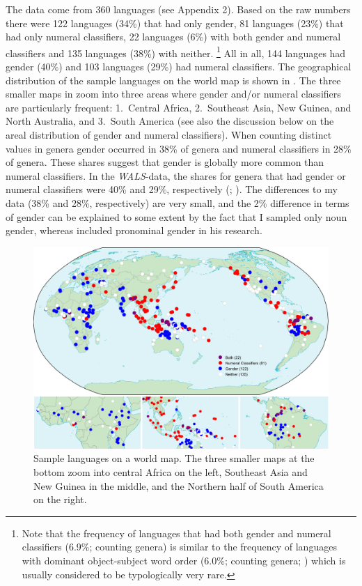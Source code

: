 \documentclass[output=collectionpaper]{langsci/langscibook}
\begin{document}
The data come from 360 languages (see Appendix 2). Based on the raw numbers there were 122 languages (34\%) that had only gender, 81 languages (23\%) that had only numeral classifiers, 22 languages (6\%) with both gender and numeral classifiers and 135 languages (38\%) with neither.%
\footnote{Note that the frequency of languages that had both gender and numeral classifiers (6.9\%; counting genera) is similar to the frequency of languages with dominant object-subject word order (6.0\%; counting genera; \citealt{Dryer2013}) which is usually considered to be typologically very rare.} %
All in all, 144 languages had gender (40\%) and 103 languages (29\%) had numeral classifiers. The geographical distribution of the sample languages on the world map is shown in . The three smaller maps in  zoom into three areas where gender and/or numeral classifiers are particularly frequent: 1.~Central Africa, 2.~Southeast Asia, New Guinea, and North Australia, and 3.~South America (see also the discussion below on the areal distribution of gender and numeral classifiers). When counting distinct values in genera gender occurred in 38\% of genera and numeral classifiers in 28\% of genera. These shares suggest that gender is globally more common than numeral classifiers. In the \textit{WALS}-data, the shares for genera that had gender or numeral classifiers were 40\% and 29\%, respectively (\citealt{Corbett2013}; \citealt{Gil2013}). The differences to my data (38\% and 28\%, respectively) are very small, and the 2\% difference in terms of gender can be explained to some extent by the fact that I sampled only noun gender, whereas \citet{Corbett2013} included pronominal gender in his research.

\begin{figure}
\includegraphics[width=\textwidth]{figures/13/Fig2_MapSample}
\caption{Sample languages on a world map. The three smaller maps at the bottom zoom into central Africa on the left, Southeast Asia and New Guinea in the middle, and the Northern half of South America on the right.}
\label{fig:Sinne:2}
\end{figure}
\end{document}
